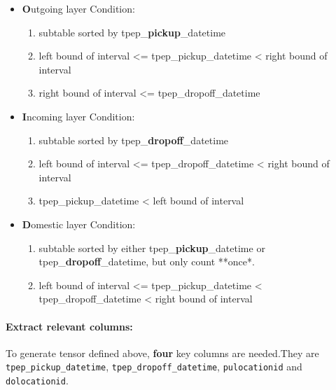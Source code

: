 \documentclass[11pt]{article}
\providecommand{\tightlist}{%
      \setlength{\itemsep}{0pt}\setlength{\parskip}{0pt}}
\begin{document}
\begin{itemize}
\tightlist
\item
  \textbf{O}utgoing layer Condition:

  \begin{enumerate}
  \def\labelenumi{\arabic{enumi}.}
  \tightlist
  \item
    subtable sorted by tpep\_\textbf{pickup}\_datetime
  \item
    left bound of interval \textless{}= tpep\_pickup\_datetime
    \textless{} right bound of interval
  \item
    right bound of interval \textless{}= tpep\_dropoff\_datetime
  \end{enumerate}
\item
  \textbf{I}ncoming layer Condition:

  \begin{enumerate}
  \def\labelenumi{\arabic{enumi}.}
  \tightlist
  \item
    subtable sorted by tpep\_\textbf{dropoff}\_datetime
  \item
    left bound of interval \textless{}= tpep\_dropoff\_datetime
    \textless{} right bound of interval
  \item
    tpep\_pickup\_datetime \textless{} left bound of interval
  \end{enumerate}
\item
  \textbf{D}omestic layer Condition:

  \begin{enumerate}
  \def\labelenumi{\arabic{enumi}.}
  \tightlist
  \item
    subtable sorted by either tpep\_\textbf{pickup}\_datetime or
    tpep\_\textbf{dropoff}\_datetime, but only count **once*.
  \item
    left bound of interval \textless{}= tpep\_pickup\_datetime
    \textless{} tpep\_dropoff\_datetime \textless{} right bound of
    interval
  \end{enumerate}
\end{itemize}

    \paragraph{Extract relevant columns:}\label{extract-relevant-columns}

To generate tensor defined above, \textbf{four} key columns are
needed.They are \texttt{tpep\_pickup\_datetime},
\texttt{tpep\_dropoff\_datetime}, \texttt{pulocationid} and
\texttt{dolocationid}.
\end{document}
